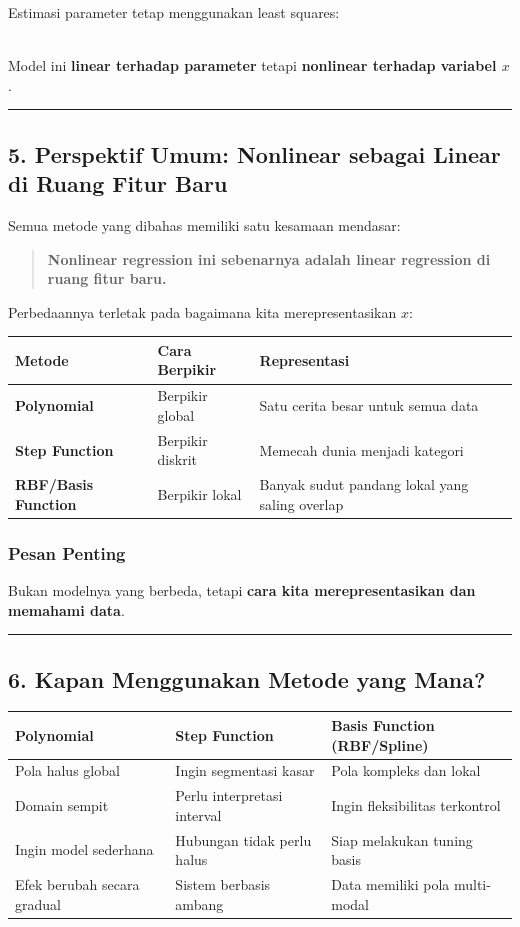 \documentclass[12pt,a4paper]{article}
\begin{document}
Estimasi parameter tetap menggunakan least squares:


\\[
\min_{\beta} \sum_{i=1}^{n} (y_i - \hat{y}(x_i))^2
\\]


Model ini \textbf{linear terhadap parameter} tetapi \textbf{nonlinear terhadap variabel $x$}.


\hrule


\subsection{5. Perspektif Umum: Nonlinear sebagai Linear di Ruang Fitur Baru}

Semua metode yang dibahas memiliki satu kesamaan mendasar:


\begin{quote}
\textbf{Nonlinear regression ini sebenarnya adalah linear regression di ruang fitur baru.}\end{quote}


Perbedaannya terletak pada bagaimana kita merepresentasikan $x$:


\begin{tabular}{|l|l|l|}
\hline
Metode & Cara Berpikir & Representasi \\
\hline
\textbf{Polynomial} & Berpikir global & Satu cerita besar untuk semua data \\
\hline
\textbf{Step Function} & Berpikir diskrit & Memecah dunia menjadi kategori \\
\hline
\textbf{RBF/Basis Function} & Berpikir lokal & Banyak sudut pandang lokal yang saling overlap \\
\hline
\end{tabular}


\subsubsection{Pesan Penting}

Bukan modelnya yang berbeda, tetapi \textbf{cara kita merepresentasikan dan memahami data}.


\hrule


\subsection{6. Kapan Menggunakan Metode yang Mana?}

\begin{tabular}{|l|l|l|}
\hline
Polynomial & Step Function & Basis Function (RBF/Spline) \\
\hline
Pola halus global & Ingin segmentasi kasar & Pola kompleks dan lokal \\
\hline
Domain sempit & Perlu interpretasi interval & Ingin fleksibilitas terkontrol \\
\hline
Ingin model sederhana & Hubungan tidak perlu halus & Siap melakukan tuning basis \\
\hline
Efek berubah secara gradual & Sistem berbasis ambang & Data memiliki pola multi-modal \\
\hline
\end{tabular}
\end{document}

